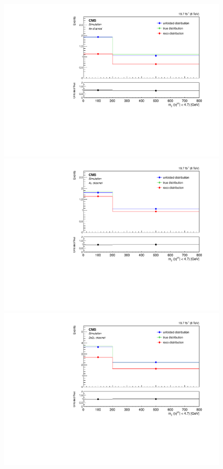 \begin{figure}[hbtp]
\begin{center}
    \includegraphics[width=0.8\cmsFigWidth]{Figures/Unfolding/MCTests/Mjj_ZZTo4e_PowMatrix_PowDistr_HalfSample_fr}     
    \includegraphics[width=0.8\cmsFigWidth]{Figures/Unfolding/MCTests/Mjj_ZZTo4m_PowMatrix_PowDistr_HalfSample_fr}     
 \includegraphics[width=0.8\cmsFigWidth]{Figures/Unfolding/MCTests/Mjj_ZZTo2e2m_PowMatrix_PowDistr_HalfSample_fr}        

\end{center}
\end{figure}
